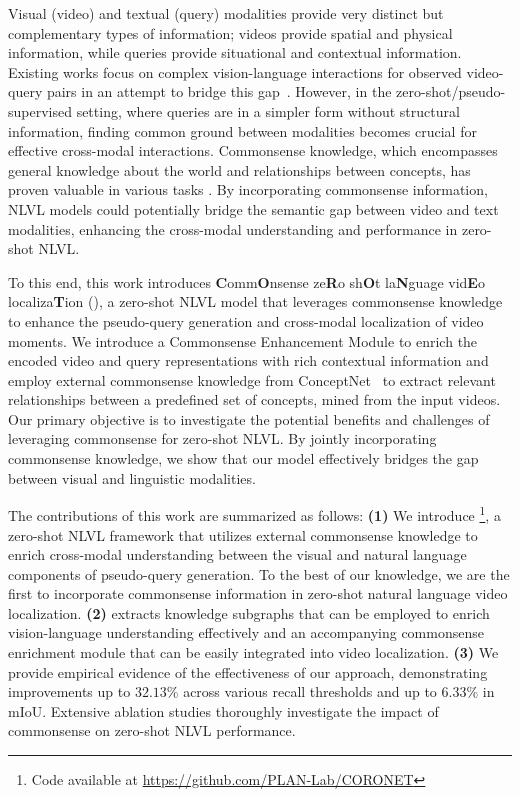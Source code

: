 Visual (video) and textual (query) modalities provide very distinct but complementary types of information; videos provide spatial and physical information, while queries provide situational and contextual information. Existing works focus on complex vision-language interactions for observed video-query pairs in an attempt to bridge this gap~\cite{nam_zero-shot_2021,mun_local-global_2020}. However, in the zero-shot/pseudo-supervised setting, where queries are in a simpler form without structural information, finding common ground between modalities becomes crucial for effective cross-modal interactions. Commonsense knowledge, which encompasses general knowledge about the world and relationships between concepts, has proven valuable in various tasks \cite{fang_video2commonsense_2020,ding_dynamic_2021,yu_hybrid_2021,li_representation_2022,maharana_integrating_2021,cao_visual_2022}. By incorporating commonsense information, NLVL models could potentially bridge the semantic gap between video and text modalities, enhancing the cross-modal understanding and performance in zero-shot NLVL.


To this end, this work introduces  \textbf{C}omm\textbf{O}nsense ze\textbf{R}o sh\textbf{O}t la\textbf{N}guage vid\textbf{E}o localiza\textbf{T}ion (\textbf{\modelname}), a zero-shot NLVL model that leverages commonsense knowledge to enhance the pseudo-query generation and cross-modal localization of video moments. We introduce a Commonsense Enhancement Module to enrich the encoded video and query representations with rich contextual information and employ external commonsense knowledge from ConceptNet~\cite{speer_conceptnet_2017} to extract relevant relationships between a predefined set of concepts, mined from the input videos. Our primary objective is to investigate the potential benefits and challenges of leveraging commonsense for zero-shot NLVL. By jointly incorporating commonsense knowledge, we show that our model effectively bridges the gap between visual and linguistic modalities.

The contributions of this work are summarized as follows:
\noindent \textbf{(1)} We introduce \modelname\footnote{Code available at \url{https://github.com/PLAN-Lab/CORONET}}, a zero-shot NLVL framework that utilizes external commonsense knowledge to enrich cross-modal understanding between the visual and natural language components of pseudo-query generation. To the best of our knowledge, we are the first to incorporate commonsense information in zero-shot natural language video localization. 
\noindent \textbf{(2)} \modelname extracts knowledge subgraphs that can be employed to enrich vision-language understanding effectively and an accompanying commonsense enrichment module that can be easily integrated into video localization. 
\noindent \textbf{(3)} We provide empirical evidence of the effectiveness of our approach, demonstrating improvements up to $32.13\%$ across various recall thresholds and up to $6.33\%$ in mIoU. Extensive ablation studies thoroughly investigate the impact of commonsense on zero-shot NLVL performance. 